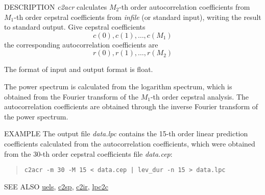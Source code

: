 \begin{synopsis}
\item[c2acr] [ --m $M_1$ ] [ --M $M_2$ ] [ --l $L$ ] [ {\em infile} ]
\end{synopsis}

\begin{qsection}{DESCRIPTION}
{\em c2acr} calculates $M_2$-th order autocorrelation coefficients 
from $M_1$-th order cepstral coefficients from {\em infile} (or standard input),
 writing the result to standard output.
Give cepstral coefficients
\begin{displaymath}
c(0), c(1), \ldots, c(M_1)
\end{displaymath}
the corresponding autocorrelation coefficients are
\begin{displaymath}
r(0), r(1), \ldots, r(M_2)
\end{displaymath}

The format of input and output format is float.

The power spectrum is calculated from the logarithm spectrum,
which is obtained from the Fourier transform of the $M_1$-th
order cepstral analysis.
The autocorrelation coefficients are obtained through the inverse
Fourier transform of the power spectrum.
\end{qsection}

\begin{options}
\end{options}

\begin{qsection}{EXAMPLE}
The output file {\em data.lpc} contains the 15-th order linear prediction
coefficients calculated from the autocorrelation coefficients,
which were obtained from the 30-th order cepstral coefficients
file {\em data.cep}:
\begin{quote}
  \verb!c2acr -m 30 -M 15 < data.cep | lev_dur -n 15 > data.lpc!
\end{quote}
\end{qsection}

\begin{qsection}{SEE ALSO}
\hyperlink{uels}{uels},
\hyperlink{c2sp}{c2sp},
\hyperlink{c2ir}{c2ir},
\hyperlink{lpc2c}{lpc2c}
\end{qsection}
